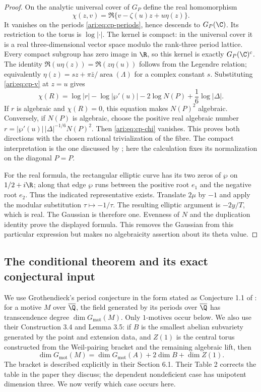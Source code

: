 \begin{proof}
On the analytic universal cover of $G_P$ define the real
homomorphism
\[
 \chi(z,v)=\Re\{v-\zeta(u)z+u\eta(z)\}.
\]
It vanishes on the periods \eqref{ari:eq:cp-periods}, hence descends
to $G_P(\C)$. Its restriction to the torus is $\log|\cdot|$.
The kernel is compact: in the universal cover it is a real
three-dimensional vector space modulo the rank-three period
lattice. Every compact subgroup has zero image in $\R$, so
this kernel is exactly $G_P(\C)^c$.
The identity
$\Re(u\eta(z))=\Re(z\eta(u))$ follows from the Legendre relation;
equivalently $\eta(z)=sz+\pi\bar z/\operatorname{area}(\Lambda)$
for a complex constant $s$. Substituting
\eqref{ari:eq:cp-v} at $z=u$ gives
\begin{equation}\label{ari:eq:cp-chi}
 \chi(R)=\log|r|-\log|\wp'(u)|
            -2\log N(P)+\frac16\log|\Delta|.
\end{equation}
If $r$ is algebraic and $\chi(R)=0$, this equation makes
$N(P)^2$ algebraic. Conversely, if $N(P)$ is algebraic,
choose the positive real algebraic number
$r=|\wp'(u)|\,|\Delta|^{-1/6}N(P)^2$.
Then \eqref{ari:eq:cp-chi} vanishes. This proves both directions
with the chosen rational trivialization of the fibre.
The compact interpretation is the one discussed by
\citet[slides 5--8]{bertrand2017}; here the calculation fixes
its normalization on the diagonal $P=P$.

For the real formula, the rectangular elliptic curve has its
two zeros of $\wp$ on $1/2+i\R$; along that edge $\wp$ runs
between the positive root $e_1$ and the negative root $e_2$.
Thus the indicated representative exists. Translate $2\mu$
by $-1$ and apply the modular substitution $\tau\mapsto-1/\tau$.
The resulting elliptic argument is $-2y/T$, which is real.
The Gaussian is therefore one. Evenness of $N$ and the
duplication identity prove the displayed formula. This removes
the Gaussian from this particular expression but makes no
algebraicity assertion about its theta value.
\end{proof}

\subsection{The conditional theorem and its exact conjectural input}

We use Grothendieck's period conjecture in the form stated as
Conjecture 1.1 of \citet{bertolin2022}: for a motive $M$ over
$\overline\Q$, the field generated by its periods over
$\overline\Q$ has transcendence degree $\dim G_{\mathrm{mot}}(M)$.
Only $1$-motives occur below. We also use their Construction 3.4
and Lemma 3.5: if $B$ is the smallest abelian subvariety
generated by the point and extension data, and $Z(1)$ is the
central torus constructed from the Weil-pairing bracket and
the remaining algebraic lift, then
\begin{equation}\label{ari:eq:cp-MTdim}
 \dim G_{\mathrm{mot}}(M)
 =\dim G_{\mathrm{mot}}(A)+2\dim B+\dim Z(1).
\end{equation}
The bracket is described explicitly in their Section 6.1.
Their Table 2 corrects the table in the paper they discuss; the
dependent nondeficient case has unipotent dimension three.
We now verify which case occurs here.

